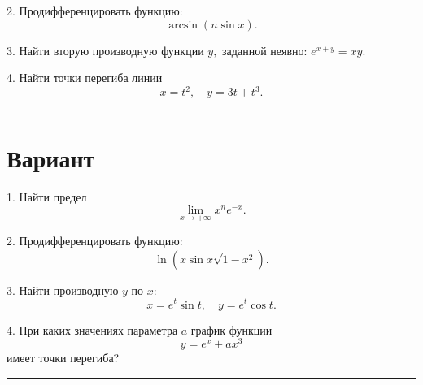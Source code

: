 \documentclass[a4paper,10pt]{article}
\newcommand{\exercize}[1]{\textbf{#1.}}
\newcommand{\HRule}{\rule{\linewidth}{0.1mm}}
\begin{document}
2. Продифференцировать функцию:
\[ \arcsin{(n \sin{x})}. \]

3. Найти вторую производную функции $y,$ заданной неявно: $ e^{x + y} = x y. $

4. Найти точки перегиба линии 
\[ x = t^2, \quad y = 3t + t^3. \]

\HRule

\section{Вариант} 

1. Найти предел
\[ \lim_{x \rightarrow + \infty}{x^n e^{-x}}. \]

2. Продифференцировать функцию:
\[ \ln{(x \sin{x} \sqrt{1 - x^2})}. \]

3. Найти производную $y$ по $x:$ 
\[ x = e^t \sin{t}, \quad y = e^t \cos{t}. \]

4. При каких значениях параметра $a$ график функции
\[ y = e^x + a x^3 \]
имеет точки перегиба?

\HRule
\end{document}
